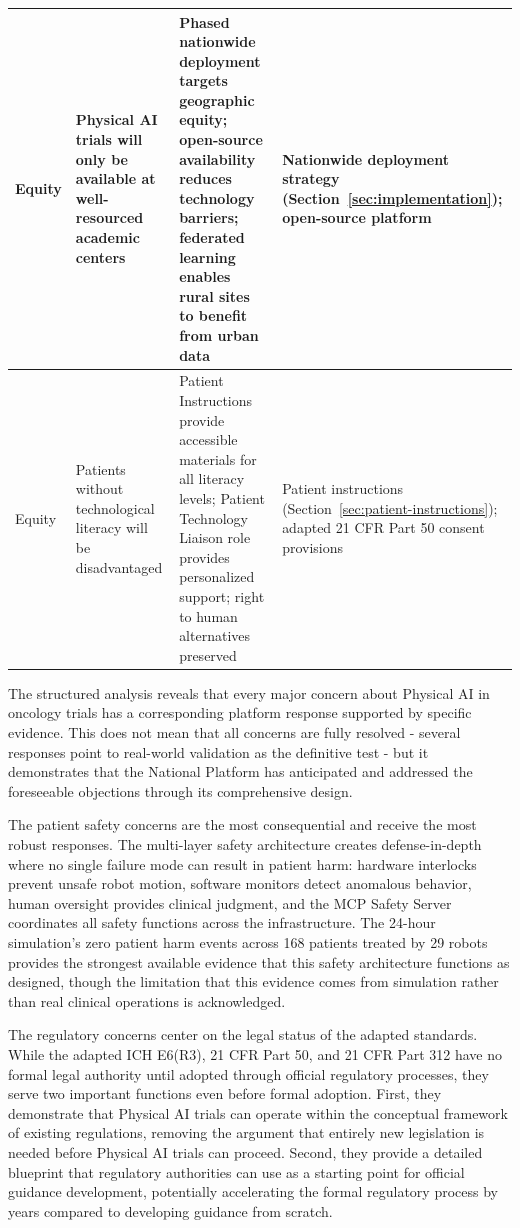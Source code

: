 \begin{longtable}{>{\raggedright\arraybackslash}p{2.2cm} >{\raggedright\arraybackslash}p{3.5cm} >{\raggedright\arraybackslash}p{4.5cm} >{\raggedright\arraybackslash}p{4.5cm}}
Equity & Physical AI trials will only be available at well-resourced academic centers & Phased nationwide deployment targets geographic equity; open-source availability reduces technology barriers; federated learning enables rural sites to benefit from urban data & Nationwide deployment strategy (Section~\ref{sec:implementation}); open-source platform \cite{main-repo, mcp-repo, fl-repo} \\
\midrule
Equity & Patients without technological literacy will be disadvantaged & Patient Instructions \cite{patient-instructions-paper} provide accessible materials for all literacy levels; Patient Technology Liaison role provides personalized support; right to human alternatives preserved & Patient instructions (Section~\ref{sec:patient-instructions}); adapted 21 CFR Part 50 \cite{cfr50-adapt} consent provisions \\
\end{longtable}

\clearpage

The structured analysis reveals that every major concern about Physical AI in
oncology trials has a corresponding platform response supported by specific
evidence. This does not mean that all concerns are fully resolved - several
responses point to real-world validation as the definitive test - but it
demonstrates that the National Platform has anticipated and addressed the
foreseeable objections through its comprehensive design.

The patient safety concerns are the most consequential and receive the most
robust responses. The multi-layer safety architecture creates defense-in-depth
where no single failure mode can result in patient harm: hardware interlocks
prevent unsafe robot motion, software monitors detect anomalous behavior,
human oversight provides clinical judgment, and the MCP Safety Server
coordinates all safety functions across the infrastructure. The 24-hour
simulation's zero patient harm events across 168 patients treated by 29 robots
provides the strongest available evidence that this safety architecture
functions as designed, though the limitation that this evidence comes from
simulation rather than real clinical operations is acknowledged.

The regulatory concerns center on the legal status of the adapted standards.
While the adapted ICH E6(R3), 21 CFR Part 50, and 21 CFR Part 312 have no
formal legal authority until adopted through official regulatory processes,
they serve two important functions even before formal adoption. First, they
demonstrate that Physical AI trials can operate within the conceptual framework
of existing regulations, removing the argument that entirely new legislation
is needed before Physical AI trials can proceed. Second, they provide a
detailed blueprint that regulatory authorities can use as a starting point
for official guidance development, potentially accelerating the formal
regulatory process by years compared to developing guidance from scratch.

